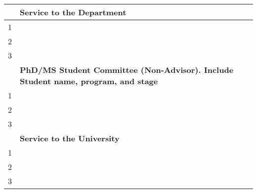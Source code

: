 \documentclass[11pt]{article}
\begin{document}
  \begin{tabular}{ll}
    \toprule
    \textbf{}& \textbf{Service to the Department}\\
      \midrule
    1& \\
    2& \\
    3& \\
    \toprule
    \textbf{}& \textbf{PhD/MS Student Committee (Non-Advisor). Include Student name, program, and stage}\\
      \midrule
    1& \\
    2& \\
    3& \\
    \toprule
    \textbf{}& \textbf{Service to the University}\\
      \midrule
    1& \\
    2& \\
    3& \\
    \bottomrule
  \end{tabular}


\end{document}
